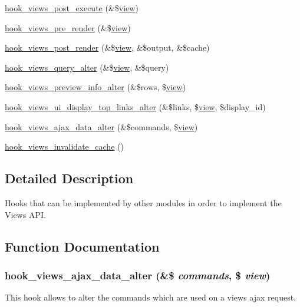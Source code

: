 \begin{DoxyCompactItemize}
\item 
\hyperlink{group__views__hooks_ga52e5f67061bf3a8cb9f8bf208d9a1357}{hook\_\-views\_\-post\_\-execute} (\&\$\hyperlink{classview}{view})
\item 
\hyperlink{group__views__hooks_gab88d5c49ec4ad30dba2be34327d5b0cc}{hook\_\-views\_\-pre\_\-render} (\&\$\hyperlink{classview}{view})
\item 
\hyperlink{group__views__hooks_ga21cc61642e5cafc23ec621f07dae1f4b}{hook\_\-views\_\-post\_\-render} (\&\$\hyperlink{classview}{view}, \&\$output, \&\$cache)
\item 
\hyperlink{group__views__hooks_gaf4d538493930fe0fa0ce6fb3bf42c156}{hook\_\-views\_\-query\_\-alter} (\&\$\hyperlink{classview}{view}, \&\$query)
\item 
\hyperlink{group__views__hooks_gafeafa28dd3e140b2d4f8cfdfc7d76922}{hook\_\-views\_\-preview\_\-info\_\-alter} (\&\$rows, \$\hyperlink{classview}{view})
\item 
\hyperlink{group__views__hooks_ga376184982a8ac07a1da0708b4975b6be}{hook\_\-views\_\-ui\_\-display\_\-top\_\-links\_\-alter} (\&\$links, \$\hyperlink{classview}{view}, \$display\_\-id)
\item 
\hyperlink{group__views__hooks_gac5c4edbedfa01ac99618dfa7bbc4e6a2}{hook\_\-views\_\-ajax\_\-data\_\-alter} (\&\$commands, \$\hyperlink{classview}{view})
\item 
\hyperlink{group__views__hooks_ga4d3be7a9646f70c9a5d321931135dd84}{hook\_\-views\_\-invalidate\_\-cache} ()
\end{DoxyCompactItemize}


\subsection{Detailed Description}
Hooks that can be implemented by other modules in order to implement the Views API. 

\subsection{Function Documentation}
\hypertarget{group__views__hooks_gac5c4edbedfa01ac99618dfa7bbc4e6a2}{
\subsubsection[{hook\_\-views\_\-ajax\_\-data\_\-alter}]{\setlength{\rightskip}{0pt plus 5cm}hook\_\-views\_\-ajax\_\-data\_\-alter (\&\$ {\em commands}, \/  \$ {\em view})}}
\label{group__views__hooks_gac5c4edbedfa01ac99618dfa7bbc4e6a2}
This hook allows to alter the commands which are used on a views ajax request.



